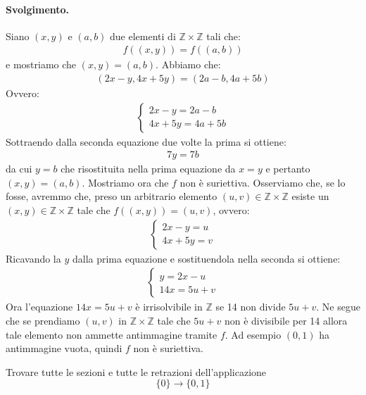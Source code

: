 \paragraph{Svolgimento.}  Siano $(x,y)$ e $(a,b)$ due elementi di $\mathbb{Z} \times \mathbb{Z}$ tali che:
\begin{align*}
	f((x,y)) = f((a,b))
\end{align*}
e mostriamo che $(x,y)=(a,b)$. Abbiamo che:
\begin{align*}
	(2x-y,4x+5y)=(2a-b,4a+5b)
\end{align*}
Ovvero:
\begin{align*}
	\begin{cases*}
		2x-y = 2a-b\\
		4x+5y = 4a+5b
	\end{cases*}
\end{align*}
Sottraendo dalla seconda equazione due volte la prima si ottiene:
\begin{align*}
	7y=7b
\end{align*}
da cui $y=b$ che risostituita nella prima equazione da $x=y$ e pertanto $(x,y)=(a,b)$. Mostriamo ora che $f$ non è suriettiva. Osserviamo che, se lo fosse, avremmo che, preso un arbitrario elemento $(u,v) \in \mathbb{Z}\times \mathbb{Z}$ esiste un $(x,y) \in \mathbb{Z} \times \mathbb{Z}$ tale che $f((x,y))=(u,v)$, ovvero:
\begin{align*}
	\begin{cases*}
		2x-y = u\\
		4x+5y = v
	\end{cases*}
\end{align*}
Ricavando la $y$ dalla prima equazione e sostituendola nella seconda si ottiene:
\begin{align*}
	\begin{cases*}
		y = 2x-u\\
		14x = 5u+v
	\end{cases*}
\end{align*}
Ora l'equazione $14x = 5u+v$ è irrisolvibile in $\mathbb{Z}$ se 14 non divide $5u+v$. Ne segue che se prendiamo $(u,v)$ in $\mathbb{Z} \times \mathbb{Z}$ tale che $5u+v$ non è divisibile per 14 allora tale elemento non ammette antimmagine tramite $f$. Ad esempio $(0,1)$ ha antimmagine vuota, quindi $f$ non è suriettiva. \hfill \blacksquare
\begin{exsbox}
	Trovare tutte le sezioni e tutte le retrazioni dell'applicazione $$\{0\} \longrightarrow \{0,1\}$$
\end{exsbox}
